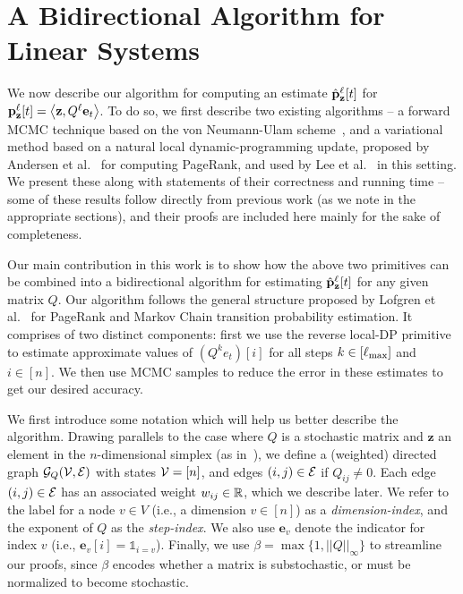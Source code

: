 \section{A Bidirectional Algorithm for Linear Systems}

We now describe our algorithm for computing an estimate $\hat{\mathbf{p}}_\mathbf{z}^{\ell}[t]$ for ${\mathbf{p}}_\mathbf{z}^{\ell}[t] =\left< \mathbf{z}, Q^{\ell}\mathbf{e}_t \right>$.
To do so, we first describe two existing algorithms -- a forward MCMC technique based on the von Neumann-Ulam scheme~\cite{Wasow1952,ji2013convergence}, and a variational method based on a natural local dynamic-programming update, proposed by Andersen et al.~\cite{andersen2007local} for computing PageRank, and used by Lee et al.~\cite{lee2014asynchronous} in this setting. 
We present these along with statements of their correctness and running time -- some of these results follow directly from previous work (as we note in the appropriate sections), and their proofs are included here mainly for the sake of completeness.


Our main contribution in this work is to show how the above two primitives can be combined into a bidirectional algorithm for estimating $\hat{\mathbf{p}}_\mathbf{z}^{\ell}[t]$ for any given matrix $Q$. 
Our algorithm follows the general structure proposed by Lofgren et al.~\cite{Lofgren2014,banerjee2015fast} for PageRank and Markov Chain transition probability estimation.
It comprises of two distinct components: first we use the reverse local-DP primitive to estimate approximate values of $\left(Q^ke_t\right)[i]$ for all steps $k\in[\ell_{\max}]$ and $i\in[n]$. 
We then use MCMC samples to reduce the error in these estimates to get our desired accuracy.


We first introduce some notation which will help us better describe the algorithm.
Drawing parallels to the case where $Q$ is a stochastic matrix and $\mathbf{z}$ an element in the $n$-dimensional simplex (as in~\cite{banerjee2015fast}), we define a (weighted) directed graph ${\mathcal{G}}_Q({\mathcal{V}},{\mathcal{E}})$ with states ${\mathcal{V}} = [n]$, and edges $(i,j)\in {\mathcal{E}}$ if $Q_{ij}\neq 0$. 
Each edge $(i,j)\in{\mathcal{E}}$ has an associated weight $w_{ij}\in\mathbb{R}$, which we describe later.
We refer to the label for a node $v\in V$ (i.e., a dimension $v\in[n]$) as a \emph{dimension-index}, and the exponent of $Q$ as the \emph{step-index}.
We also use $\mathbf{e}_v$ denote the indicator for index $v$ (i.e., $\mathbf{e}_v[i] = \mathds{1}_{i=v}$). 
Finally, we use $\beta = \max\{1, ||Q||_\infty\}$ to streamline our proofs, since $\beta$ encodes whether a matrix is substochastic, or must be normalized to become stochastic.


